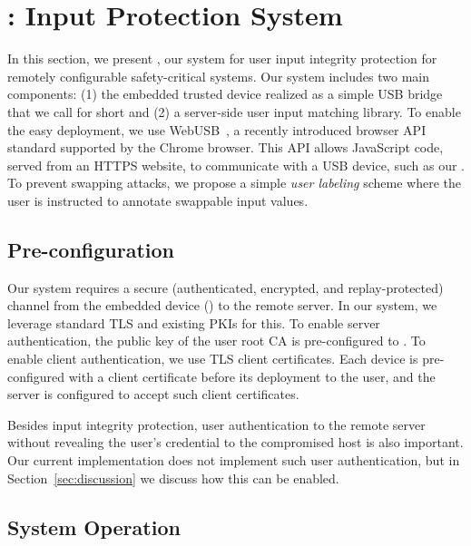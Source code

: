 
\section{\name: Input Protection System}
\label{sec:integriKey}

In this section, we present \name, our system for user input integrity protection for remotely configurable safety-critical systems. Our system includes two main components: (1) the embedded trusted device realized as a simple USB bridge that we call for short \device and (2) a server-side user input matching library. To enable the easy deployment, we use WebUSB~\cite{webusb}, a recently introduced browser API standard supported by the Chrome browser. This API allows JavaScript code, served from an HTTPS website, to communicate with a USB device, such as our \device. To prevent swapping attacks, we propose a simple \emph{user labeling} scheme where the user is instructed to annotate swappable input values. 

\subsection{Pre-configuration}
\label{sec:integriKey:initialization} 

Our system requires a secure (authenticated, encrypted, and replay-protected) channel from the embedded device (\device) to the remote server. In our system, we leverage standard TLS and existing PKIs for this. To enable server authentication, the public key of the user root CA is pre-configured to \device. To enable client authentication, we use TLS client certificates. Each \device device is pre-configured with a client certificate before its deployment to the user, and the server is configured to accept such client certificates. 

Besides input integrity protection, user authentication to the remote server without revealing the user's credential to the compromised host is also important. Our current implementation does not implement such user authentication, but in Section~\ref{sec:discussion} we discuss how this can be enabled.



\subsection{System Operation}

